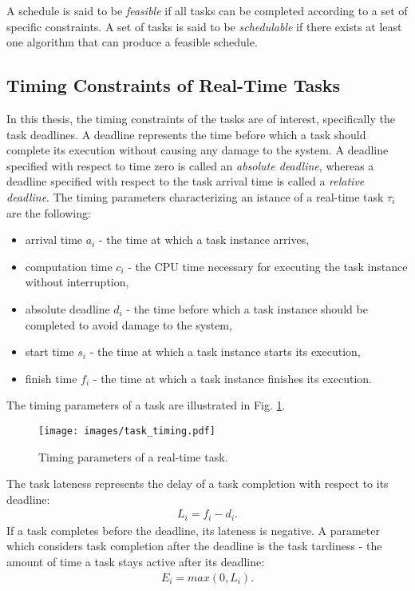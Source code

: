A schedule is said to be \textit{feasible} if all tasks can be completed according to a set of specific constraints.
A set of tasks is said to be \textit{schedulable} if there exists at least one algorithm that can produce a feasible schedule.

\subsection{Timing Constraints of Real-Time Tasks}
In this thesis, the timing constraints of the tasks are of interest, specifically the task deadlines.
A deadline represents the time before which a task should complete its execution without causing any damage to the system.
A deadline specified with respect to time zero is called an \textit{absolute deadline}, whereas a deadline specified with respect to the task arrival time is called a \textit{relative deadline}.
The timing parameters characterizing an istance of a real-time task $\tau_i$ are the following:
\begin{itemize}
    \item arrival time $a_i$ - the time at which a task instance arrives,
    \item computation time $c_i$ - the CPU time necessary for executing the task instance without interruption,
    \item absolute deadline $d_i$ - the time before which a task instance should be completed to avoid damage to the system,
    \item start time $s_i$ - the time at which a task instance starts its execution,
    \item finish time $f_i$ - the time at which a task instance finishes its execution.
\end{itemize}
The timing parameters of a task are illustrated in Fig. \ref{task_timing}.
\begin{figure}[ht]
    \centering
    \texttt{[image: images/task\_timing.pdf]}
    \caption{Timing parameters of a real-time task.}
    \label{task_timing}
\end{figure}
The task lateness represents the delay of a task completion with respect to its deadline:
\begin{align*}
L_i = f_i - d_i.
\end{align*}
If a task completes before the deadline, its lateness is negative.
A parameter which considers task completion after the deadline is the task tardiness - the amount of time a task stays active after its deadline:
\begin{align*}
E_i = max( 0, L_i ).
\end{align*}

